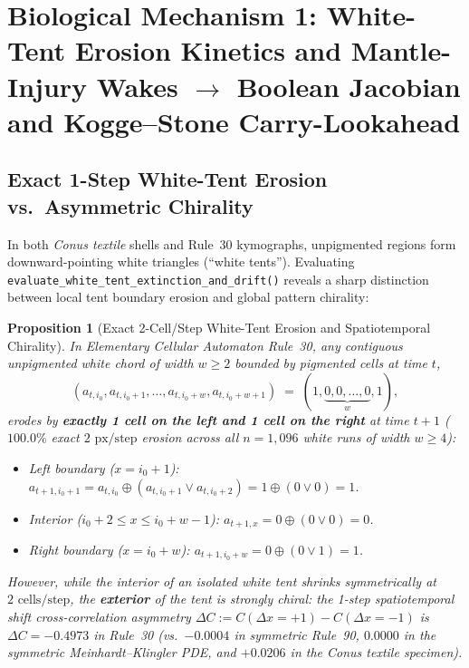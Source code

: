 \documentclass[11pt,a4paper]{article}
\newtheorem{proposition}[theorem]{Proposition}
\theoremstyle{definition}
\theoremstyle{remark}
\begin{document}
\section{Biological Mechanism 1: White-Tent Erosion Kinetics and Mantle-Injury Wakes $\longrightarrow$ Boolean Jacobian and Kogge--Stone Carry-Lookahead}

\subsection{Exact 1-Step White-Tent Erosion vs.\ Asymmetric Chirality}

In both \emph{Conus textile} shells and Rule~30 kymographs, unpigmented regions form downward-pointing white triangles (``white tents''). Evaluating \texttt{evaluate\_white\_tent\_extinction\_and\_drift()} reveals a sharp distinction between local tent boundary erosion and global pattern chirality:

\begin{proposition}[Exact 2-Cell/Step White-Tent Erosion and Spatiotemporal Chirality]\label{prop:erosion}
In Elementary Cellular Automaton Rule~30, any contiguous unpigmented white chord of width $w \ge 2$ bounded by pigmented cells at time $t$,
\begin{equation}
  (a_{t, i_0}, a_{t, i_0+1}, \dots, a_{t, i_0+w}, a_{t, i_0+w+1}) \;=\; (1, \underbrace{0, 0, \dots, 0}_{w}, 1),
\end{equation}
erodes by \textbf{exactly 1 cell on the left and 1 cell on the right} at time $t+1$ ($100.0\%$ exact $2\text{ px/step}$ erosion across all $n = 1{,}096$ white runs of width $w \ge 4$):
\begin{itemize}
  \item Left boundary ($x = i_0 + 1$): $a_{t+1, i_0+1} = a_{t, i_0} \oplus (a_{t, i_0+1} \lor a_{t, i_0+2}) = 1 \oplus (0 \lor 0) = 1$.
  \item Interior ($i_0 + 2 \le x \le i_0 + w - 1$): $a_{t+1, x} = 0 \oplus (0 \lor 0) = 0$.
  \item Right boundary ($x = i_0 + w$): $a_{t+1, i_0+w} = 0 \oplus (0 \lor 1) = 1$.
\end{itemize}
However, while the interior of an isolated white tent shrinks symmetrically at $2\text{ cells/step}$, the \textbf{exterior} of the tent is strongly chiral: the 1-step spatiotemporal shift cross-correlation asymmetry $\Delta C := C(\Delta x = +1) - C(\Delta x = -1)$ is $\Delta C = -0.4973$ in Rule~30 (vs.\ $-0.0004$ in symmetric Rule~90, $0.0000$ in the symmetric Meinhardt--Klingler PDE, and $+0.0206$ in the \emph{Conus textile} specimen).
\end{proposition}
\end{document}
